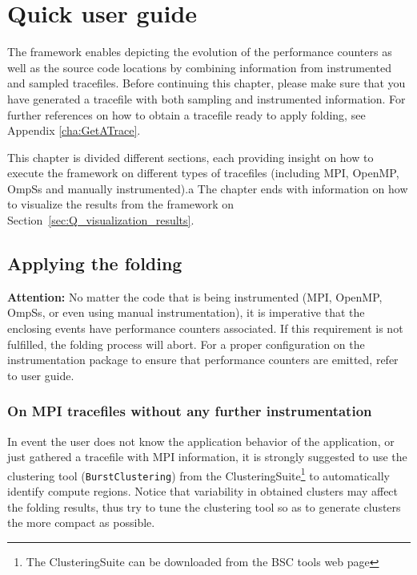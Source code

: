 \chapter{Quick user guide}\label{cha:QuickUserGuide}

The \FOLDING framework enables depicting the evolution of the performance counters as well as the source code locations by combining information from instrumented and sampled tracefiles.
Before continuing this chapter, please make sure that you have generated a tracefile with both sampling and instrumented information.
For further references on how to obtain a tracefile ready to apply folding, see Appendix \ref{cha:GetATrace}.

This chapter is divided different sections, each providing insight on how to execute the framework on different types of tracefiles (including MPI, OpenMP, OmpSs and manually instrumented).a
The chapter ends with information on how to visualize the results from the framework on Section~\ref{sec:Q_visualization_results}.

\section{Applying the folding}

\textbf{Attention:} No matter the code that is being instrumented (MPI, OpenMP, OmpSs, or even using manual instrumentation), it is imperative that the enclosing events have performance counters associated.
If this requirement is not fulfilled, the folding process will abort.
For a proper configuration on the instrumentation package to ensure that performance counters are emitted, refer to \TRACE user guide.

\subsection{On MPI tracefiles without any further instrumentation}

In event the user does not know the application behavior of the application, or just gathered a tracefile with MPI information, it is strongly suggested to use the clustering tool (\texttt{BurstClustering}) from the ClusteringSuite\footnote{The ClusteringSuite can be downloaded from the BSC tools web page} to automatically identify compute regions.
Notice that variability in obtained clusters may affect the folding results, thus try to tune the clustering tool so as to generate clusters the more compact as possible.


